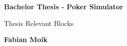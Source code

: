 

\begin{titlepage}
       \begin{center}
             \begin{huge}
                   \textbf{Bachelor Thesis - Poker Simulator}
             \end{huge}
       \end{center}
       \begin{center}
             \begin{large}
		Thesis Relevant Blocks
             \end{large}
       \end{center}
       \begin{center}
             \begin{large}
                 \textbf{Fabian Moik}
             \end{large}
       \end{center}
\end{titlepage}





%    
%    


\tableofcontents


